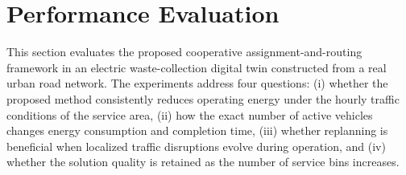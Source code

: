 \section{Performance Evaluation}
\label{sec:evaluation}

This section evaluates the proposed cooperative assignment-and-routing
framework in an electric waste-collection digital twin constructed from a
real urban road network. The experiments address four questions: (i) whether
the proposed method consistently reduces operating energy under the hourly
traffic conditions of the service area, (ii) how the exact number of active
vehicles changes energy consumption and completion time, (iii) whether
replanning is beneficial when localized traffic disruptions evolve during
operation, and (iv) whether the solution quality is retained as the number of
service bins increases.

